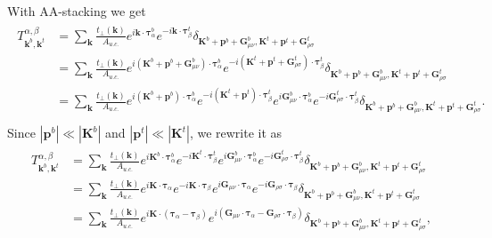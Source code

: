 \documentclass[10pt, oneside]{article}
\newcommand{\p}[1]{\left(#1\right)}
\begin{document}
With AA-stacking we get 
\begin{align}
	\begin{split}
		T^{\alpha, \beta}_{\bm{k}^{b}, \bm{k}^{t}} &= \sum_{\bm{k}} \frac{t_{\perp} \p{\bm{k}}}{A_{u.c.}} e^{i \bm{k} \cdot \bm{\tau}^{b}_{\alpha}}  e^{-i \bm{k} \cdot \bm{\tau}^{t}_{\beta}} \delta_{\bm{K}^b + \bm{p}^b + \bm{G}^{b}_{\mu \nu},  \bm{K}^{t} + \bm{p}^{t}+ \bm{G}^{t}_{\rho \sigma}}\\
		& = \sum_{\bm{k}} \frac{t_{\perp} \p{\bm{k}}}{A_{u.c.}} e^{i \p{\bm{K}^b + \bm{p}^b + \bm{G}^{b}_{\mu \nu}} \cdot \bm{\tau}^{b}_{\alpha}}  e^{-i \p{\bm{K}^{t} + \bm{p}^{t}+ \bm{G}^{t}_{\rho \sigma}} \cdot \bm{\tau}^{t}_{\beta}} \delta_{\bm{K}^b + \bm{p}^b + \bm{G}^{b}_{\mu \nu},  \bm{K}^{t} + \bm{p}^{t}+ \bm{G}^{t}_{\rho \sigma}} \\
		& = \sum_{\bm{k}} \frac{t_{\perp} \p{\bm{k}}}{A_{u.c.}} e^{i \p{\bm{K}^b + \bm{p}^b} \cdot \bm{\tau}^{b}_{\alpha}} e^{-i \p{\bm{K}^{t} + \bm{p}^{t}} \cdot \bm{\tau}^{t}_{\beta}} e^{i \bm{G}^{b}_{\mu \nu} \cdot \bm{\tau}^{b}_{\alpha}} e^{-i \bm{G}^{t}_{\rho \sigma} \cdot \bm{\tau}^{t}_{\beta}} \delta_{\bm{K}^b + \bm{p}^b + \bm{G}^{b}_{\mu \nu},  \bm{K}^{t} + \bm{p}^{t}+ \bm{G}^{t}_{\rho \sigma}}. \\
	\end{split}
\end{align}
Since \(|\bm{p}^{b}| \ll |\bm{K}^{b}|\) and \(|\bm{p}^{t}| \ll |\bm{K}^{t}|\), we rewrite it as 
\begin{align}
	\begin{split}
		T^{\alpha, \beta}_{\bm{k}^{b}, \bm{k}^{t}} &= \sum_{\bm{k}} \frac{t_{\perp} \p{\bm{k}}}{A_{u.c.}} e^{i \bm{K}^b \cdot \bm{\tau}^{b}_{\alpha}} e^{-i \bm{K}^{t} \cdot \bm{\tau}^{t}_{\beta}} e^{i \bm{G}^{b}_{\mu \nu} \cdot \bm{\tau}^{b}_{\alpha}} e^{-i \bm{G}^{t}_{\rho \sigma} \cdot \bm{\tau}^{t}_{\beta}} \delta_{\bm{K}^b + \bm{p}^b + \bm{G}^{b}_{\mu \nu},  \bm{K}^{t} + \bm{p}^{t}+ \bm{G}^{t}_{\rho \sigma}} \\
		& = \sum_{\bm{k}} \frac{t_{\perp} \p{\bm{k}}}{A_{u.c.}} e^{i \bm{K} \cdot \bm{\tau}_{\alpha}} e^{-i \bm{K} \cdot \bm{\tau}_{\beta}} e^{i \bm{G}_{\mu \nu} \cdot \bm{\tau}_{\alpha}} e^{-i \bm{G}_{\rho \sigma} \cdot \bm{\tau}_{\beta}} \delta_{\bm{K}^b + \bm{p}^b + \bm{G}^{b}_{\mu \nu},  \bm{K}^{t} + \bm{p}^{t}+ \bm{G}^{t}_{\rho \sigma}} \\
		& = \sum_{\bm{k}} \frac{t_{\perp} \p{\bm{k}}}{A_{u.c.}} e^{i \bm{K} \cdot \p{\bm{\tau}_{\alpha} - \bm{\tau}_{\beta}}}  e^{i \p{\bm{G}_{\mu \nu} \cdot \bm{\tau}_{\alpha} - \bm{G}_{\rho \sigma} \cdot \bm{\tau}_{\beta}}} \delta_{\bm{K}^b + \bm{p}^b + \bm{G}^{b}_{\mu \nu},  \bm{K}^{t} + \bm{p}^{t}+ \bm{G}^{t}_{\rho \sigma}},
	\end{split}
\end{align}
\end{document}
